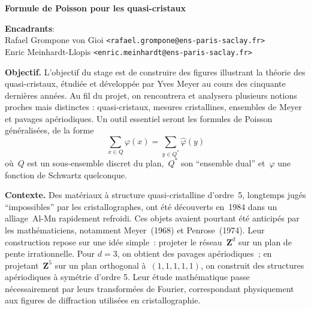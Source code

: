 \documentclass[a4paper,11pt]{article}
\begin{document}
\thispagestyle{empty}

{\bf
	Formule de Poisson pour les quasi-cristaux
}

{\bf Encadrants}:\\
Rafael Grompone von Gioi \verb+<rafael.grompone@ens-paris-saclay.fr>+\\
Enric Meinhardt-Llopis \verb+<enric.meinhardt@ens-paris-saclay.fr>+

{\bf Objectif.}
L’objectif du stage est de construire des figures illustrant la théorie des
quasi-cristaux, étudiée et développée par Yves Meyer au cours des cinquante
dernières années.  Au fil du projet, on rencontrera et analysera
plusieurs notions proches mais distinctes : quasi-cristaux, mesures
cristallines, ensembles de Meyer et pavages apériodiques.
Un outil essentiel seront les formules de Poisson
généralisées, de la forme
\[
	\sum_{x\in Q}\varphi(x) = \sum_{y\in Q^*}\widehat\varphi(y)
\]
où~$Q$ est un sous-ensemble discret du plan,~$Q^*$ son ``ensemble
dual'' et~$\varphi$ une fonction de Schwartz quelconque.




{\bf Contexte.}
Des matériaux à structure quasi-cristalline d’ordre~5, longtemps jugés
``impossibles'' par les cristallographes, ont été découverts en~1984 dans un
alliage~$\mathrm{Al}$-$\mathrm{Mn}$ rapidement refroidi. Ces objets avaient
pourtant été anticipés par les mathématiciens, notamment Meyer~(1968) et
Penrose~(1974).  Leur construction repose sur une idée simple~: projeter
le réseau~$\mathbf{Z}^d$ sur un plan de pente irrationnelle. Pour $d=3$, on
obtient des pavages apériodiques~; en projetant~$\mathbf{Z}^5$ sur un plan
orthogonal à~$(1,1,1,1,1)$, on construit des structures apériodiques à symétrie
d’ordre 5.  Leur étude mathématique passe nécessairement par leurs transformées
de Fourier, correspondant physiquement aux figures de diffraction utilisées en
cristallographie.
\end{document}
